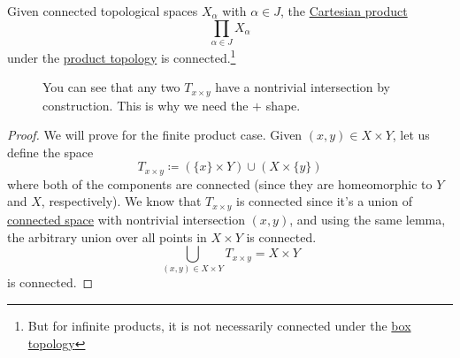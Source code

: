   \begin{theorem}
    \label{thm:products-of-connected-spaces-are-connected}
    Given connected topological spaces $X_\alpha$ with $\alpha \in J$, the \hyperref[st-def:cart-prod-2]{Cartesian product} 
    \begin{equation}
      \prod_{\alpha \in J} X_\alpha
    \end{equation}
    under the \hyperref[def:product-topology]{product topology} is connected.\footnote{But for infinite products, it is not necessarily connected under the \hyperref[def:box-topology]{box topology}} 

    \begin{figure}[H]
      \centering 
      \caption{You can see that any two $T_{x \times y}$ have a nontrivial intersection by construction. This is why we need the $+$ shape.} 
    \end{figure}
  \end{theorem}
  \begin{proof}
    We will prove for the finite product case. Given $(x, y) \in X \times Y$, let us define the space 
    \begin{equation}
      T_{x \times y} \coloneqq (\{x\} \times Y) \cup (X \times \{y\})
    \end{equation}
    where both of the components are connected (since they are homeomorphic to $Y$ and $X$, respectively). We know that $T_{x \times y}$ is connected since it's a union of \hyperref[def:connected-space]{connected space} with nontrivial intersection $(x, y)$, and using the same lemma, the arbitrary union over all points in $X \times Y$ is connected. 
    \begin{equation}
      \bigcup_{(x, y) \in X \times Y} T_{x \times y} = X \times Y
    \end{equation}
    is connected. 
  \end{proof}


